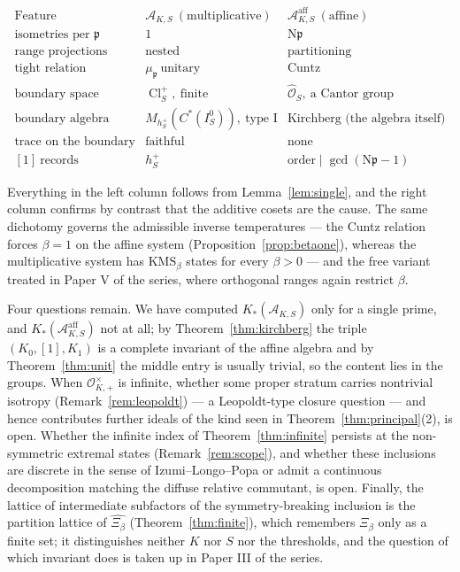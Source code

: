 \documentclass[11pt]{amsart}
\numberwithin{equation}{section}
\theoremstyle{definition}
\theoremstyle{remark}
\newcommand{\cA}{\mathcal{A}}
\newcommand{\cO}{\mathcal{O}}
\newcommand{\hO}{\widehat{\cO}}
\newcommand{\pp}{\mathfrak{p}}
\newcommand{\Ns}{\mathrm{N}}
\newcommand{\Cl}{\operatorname{Cl}}
\begin{document}
\[
\begin{array}{lll}
\text{Feature} & \cA_{K,S}\ (\text{multiplicative}) & \cA^{\mathrm{aff}}_{K,S}\ (\text{affine})\\\hline
\text{isometries per }\pp & 1 & \Ns\pp\\
\text{range projections} & \text{nested} & \text{partitioning}\\
\text{tight relation} & \mu_\pp\ \text{unitary} & \text{Cuntz}\\
\text{boundary space} & \Cl^+_S,\ \text{finite} & \hO_S,\ \text{a Cantor group}\\
\text{boundary algebra} & M_{h^+_S}(C^*(I_S^0)),\ \text{type }\mathrm I & \text{Kirchberg (the algebra itself)}\\
\text{trace on the boundary} & \text{faithful} & \text{none}\\
{[1]}\ \text{records} & h^+_S & \text{order}\mid\gcd(\Ns\pp-1)
\end{array}
\]

Everything in the left column follows from Lemma~\ref{lem:single}, and the right column
confirms by contrast that the additive cosets are the cause. The same dichotomy governs the
admissible inverse temperatures --- the Cuntz relation forces $\beta=1$ on the affine
system (Proposition~\ref{prop:betaone}), whereas the multiplicative system has
$\mathrm{KMS}_\beta$ states for every $\beta>0$ \cite[Thm.~3.6]{Main} --- and the free
variant treated in Paper V of the series, where orthogonal ranges again restrict $\beta$.

Four questions remain. We have computed $K_*(\cA_{K,S})$ only for a single prime, and
$K_*(\cA^{\mathrm{aff}}_{K,S})$ not at all; by Theorem~\ref{thm:kirchberg} the triple
$(K_0,[1],K_1)$ is a complete invariant of the affine algebra and by Theorem~\ref{thm:unit}
the middle entry is usually trivial, so the content lies in the groups. When
$\cO^\times_{K,+}$ is infinite, whether some proper stratum carries nontrivial isotropy
(Remark~\ref{rem:leopoldt}) --- a Leopoldt-type closure question --- and hence contributes
further ideals of the kind seen in Theorem~\ref{thm:principal}(2), is open. Whether the
infinite index of Theorem~\ref{thm:infinite} persists at the non-symmetric extremal states
(Remark~\ref{rem:scope}), and whether these inclusions are discrete in the sense of
Izumi--Longo--Popa \cite{ILP} or admit a continuous decomposition matching the diffuse
relative commutant, is open. Finally, the lattice of intermediate subfactors
\cite{Watatani} of the symmetry-breaking inclusion is the partition lattice of
$\widehat{\Xi_\beta}$ (Theorem~\ref{thm:finite}), which remembers $\Xi_\beta$ only as a finite
set; it distinguishes neither $K$ nor $S$ nor the thresholds, and the question of which
invariant does is taken up in Paper III of the series.
\end{document}
